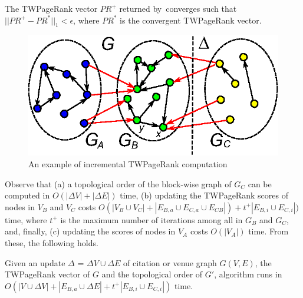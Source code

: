 \vspace{-1ex}
\begin{theorem}
\label{lemma-subgraphA}
The TWPageRank vector $PR^+$ returned by~\inctwprscc converges such that $||PR^+-PR^{*}||_1 < \epsilon$, where $PR^{*}$ is the convergent TWPageRank vector.
\end{theorem}


\begin{figure}[tb!]
\centering
\includegraphics[scale=0.7]{fig/General_framework_peak.eps}
\vspace{-1ex}
\caption{\small An example of incremental TWPageRank computation}
\label{fig-inc-division}
\vspace{-3ex}
\end{figure}

Observe that (a) a topological order of the block-wise graph of $G_C$ can be computed in $O(|\Delta V|+|\Delta E|)$ time,
(b) updating the TWPageRank scores of nodes in $V_B$ and $V_C$ costs $O(|V_B\cup V_C|+|E_{B,a}\cup E_{C,a}\cup E_{CB}|)+t^+|E_{B,i}\cup E_{C,i}|)$ time, where $t^+$ is  the maximum number of iterations among all \sccs in $G_B$ and $G_C$, and, finally, (c) updating the scores of nodes in $V_A$ costs $O(|V_A|)$ time. From these, the following holds.


\begin{prop} \label{lemma-inc-citation-comp}
Given an update $\Delta$ = $\Delta V\cup\Delta E$ of citation or venue graph $G(V,E)$, the TWPageRank vector of $G$ and the topological order of $G'$, algorithm \inctwprscc runs in $O(|V\cup \Delta V| + |E_{B,a}\cup \Delta E| + t^+|E_{B,i}\cup E_{C,i}|)$ time.
\end{prop}



